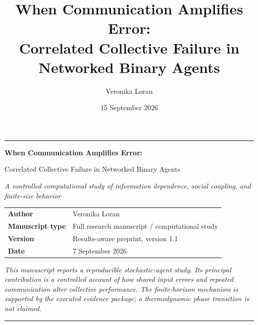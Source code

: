\documentclass[11pt,a4paper]{article}
\title{\textbf{When Communication Amplifies Error:}\\[0.25em]
\large Correlated Collective Failure in Networked Binary Agents}
\author{Veronika Loran}
\date{15 September 2026}
\begin{document}
\begin{titlepage}
\thispagestyle{empty}
\color{accent}\rule{\textwidth}{1.2pt}
\vspace{1.1cm}
\begin{center}
  {\Huge\bfseries\color{ink} When Communication Amplifies Error:}\par
  \vspace{0.35cm}
  {\LARGE\color{ink} Correlated Collective Failure in Networked Binary Agents}\par
  \vspace{1.0cm}
  {\large\itshape\color{muted} A controlled computational study of information dependence, social coupling, and finite-size behavior}\par
\end{center}
\vfill
\begin{center}
  \color{ink}
  \begin{tabular}{ll}
    \textbf{Author} & Veronika Loran \\
    \textbf{Manuscript type} & Full research manuscript / computational study \\
    \textbf{Version} & Results-aware preprint, version 1.1 \\
    \textbf{Date} & 7 September 2026 \\
  \end{tabular}
\end{center}
\vfill
\begin{center}
  \begin{minipage}{0.82\textwidth}
  \small\itshape\color{muted}
  This manuscript reports a reproducible stochastic-agent study. Its principal contribution is a controlled account of how shared input errors and repeated communication alter collective performance. The finite-horizon mechanism is supported by the executed evidence package; a thermodynamic phase transition is not claimed.
  \end{minipage}
\end{center}
\vspace{0.5cm}
\color{accent}\rule{\textwidth}{1.2pt}
\end{titlepage}

\clearpage
{}
\tableofcontents
\clearpage
{}
\setcounter{page}{1}
\end{document}
